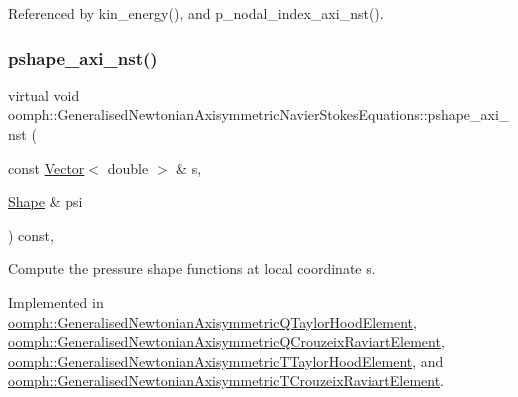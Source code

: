 Referenced by kin\+\_\+energy(), and p\+\_\+nodal\+\_\+index\+\_\+axi\+\_\+nst().

\mbox{\label{classoomph_1_1GeneralisedNewtonianAxisymmetricNavierStokesEquations_a45e6df6b18daa524c32659572470cc7b}} 
\subsubsection{\texorpdfstring{pshape\+\_\+axi\+\_\+nst()}{pshape\_axi\_nst()}\hspace{0.1cm}{\footnotesize\ttfamily [1/2]}}
{\footnotesize\ttfamily virtual void oomph\+::\+Generalised\+Newtonian\+Axisymmetric\+Navier\+Stokes\+Equations\+::pshape\+\_\+axi\+\_\+nst (\begin{DoxyParamCaption}\item[{const \hyperlink{classoomph_1_1Vector}{Vector}$<$ double $>$ \&}]{s,  }\item[{\hyperlink{classoomph_1_1Shape}{Shape} \&}]{psi }\end{DoxyParamCaption}) const\hspace{0.3cm}{\ttfamily [protected]}, {}}



Compute the pressure shape functions at local coordinate s. 



Implemented in \hyperlink{classoomph_1_1GeneralisedNewtonianAxisymmetricQTaylorHoodElement_a66364d5ce2c8dd8770066ef295ec9427}{oomph\+::\+Generalised\+Newtonian\+Axisymmetric\+Q\+Taylor\+Hood\+Element}, \hyperlink{classoomph_1_1GeneralisedNewtonianAxisymmetricQCrouzeixRaviartElement_a06e8ec5317b4d6a746eaec17c65a2787}{oomph\+::\+Generalised\+Newtonian\+Axisymmetric\+Q\+Crouzeix\+Raviart\+Element}, \hyperlink{classoomph_1_1GeneralisedNewtonianAxisymmetricTTaylorHoodElement_a6da92d71afc74c7341a5bf2cd39f2f45}{oomph\+::\+Generalised\+Newtonian\+Axisymmetric\+T\+Taylor\+Hood\+Element}, and \hyperlink{classoomph_1_1GeneralisedNewtonianAxisymmetricTCrouzeixRaviartElement_a1b9ec235ffab0005d4f38fe0fc639491}{oomph\+::\+Generalised\+Newtonian\+Axisymmetric\+T\+Crouzeix\+Raviart\+Element}.



